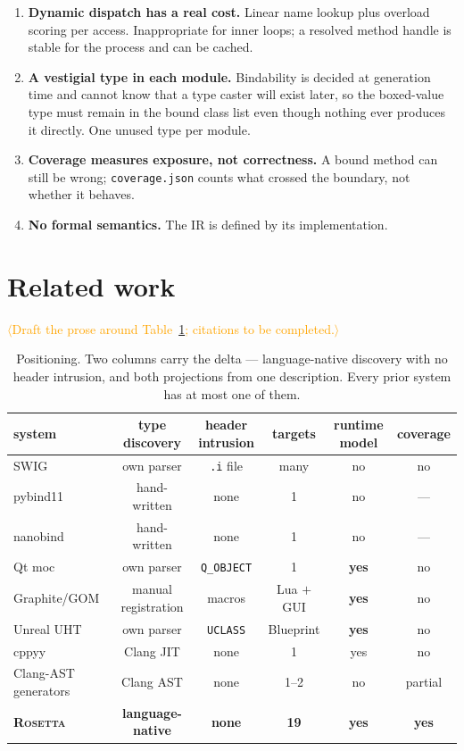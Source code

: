 \documentclass[11pt,a4paper]{article}
\newcommand{\gap}[1]{\textcolor{orange}{\textsf{\small$\langle$#1$\rangle$}}}
\newcommand{\rosetta}{\textsc{Rosetta}}
\newcommand{\code}[1]{\texttt{\small #1}}
\begin{document}
\begin{enumerate}
    its generation time --- not the pipeline.
  \item \textbf{Dynamic dispatch has a real cost.} Linear name lookup plus
    overload scoring per access. Inappropriate for inner loops; a resolved
    method handle is stable for the process and can be cached.
  \item \textbf{A vestigial type in each module.} Bindability is decided at
    generation time and cannot know that a type caster will exist later, so the
    boxed-value type must remain in the bound class list even though nothing
    ever produces it directly. One unused type per module.
  \item \textbf{Coverage measures exposure, not correctness.} A bound method can
    still be wrong; \code{coverage.json} counts what crossed the boundary, not
    whether it behaves.
  \item \textbf{No formal semantics.} The IR is defined by its implementation.
\end{enumerate}

\section{Related work}
\label{sec:related}

\gap{Draft the prose around Table~\ref{tab:related}; citations to be completed.}

\begin{table}[h]
\centering\footnotesize
\begin{tabular}{lccccc}
\toprule
system & type discovery & header intrusion & targets & runtime model & coverage \\
\midrule
SWIG~\cite{swig}            & own parser        & \code{.i} file & many & no & no \\
pybind11~\cite{pybind11}    & hand-written      & none & 1 & no & --- \\
nanobind~\cite{nanobind}    & hand-written      & none & 1 & no & --- \\
Qt moc~\cite{qt}            & own parser        & \code{Q\_OBJECT} & 1 & \textbf{yes} & no \\
Graphite/GOM~\cite{graphite}& manual registration & macros & Lua $+$ GUI & \textbf{yes} & no \\
Unreal UHT~\cite{unreal}    & own parser        & \code{UCLASS} & Blueprint & \textbf{yes} & no \\
cppyy~\cite{cppyy}          & Clang JIT         & none & 1 & yes & no \\
Clang-AST generators        & Clang AST         & none & 1--2 & no & partial \\
\midrule
\textbf{\rosetta}           & \textbf{language-native} & \textbf{none} & \textbf{19} & \textbf{yes} & \textbf{yes} \\
\bottomrule
\end{tabular}
\caption{Positioning. Two columns carry the delta --- language-native discovery
with no header intrusion, and both projections from one description. Every prior
system has at most one of them.}
\label{tab:related}
\end{table}
\end{document}
